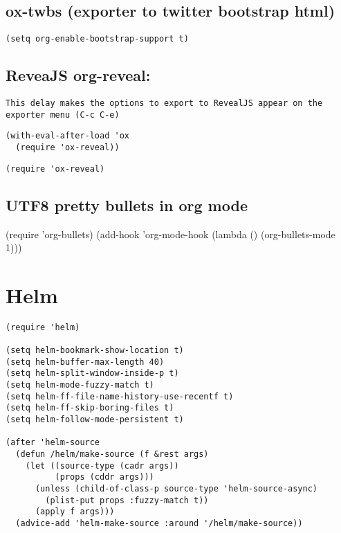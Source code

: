 \documentclass[11pt]{article}
\begin{document}
\subsection*{ox-twbs (exporter to twitter bootstrap html)}
\label{sec:orge287151}
\begin{verbatim}
(setq org-enable-bootstrap-support t)
\end{verbatim}

\subsection*{ReveaJS org-reveal:}
\label{sec:org500e21b}
\begin{verbatim}
This delay makes the options to export to RevealJS appear on the exporter menu (C-c C-e)
\end{verbatim}


\begin{verbatim}
(with-eval-after-load 'ox
  (require 'ox-reveal))
\end{verbatim}

\begin{verbatim}
(require 'ox-reveal)
\end{verbatim}


\subsection*{UTF8 pretty bullets in org mode}
\label{sec:org3bdd29f}
(require 'org-bullets)
(add-hook 'org-mode-hook (lambda () (org-bullets-mode 1)))


\section*{Helm}
\label{sec:orga8f7555}

\begin{verbatim}
(require 'helm)

(setq helm-bookmark-show-location t)
(setq helm-buffer-max-length 40)
(setq helm-split-window-inside-p t)
(setq helm-mode-fuzzy-match t)
(setq helm-ff-file-name-history-use-recentf t)
(setq helm-ff-skip-boring-files t)
(setq helm-follow-mode-persistent t)

(after 'helm-source
  (defun /helm/make-source (f &rest args)
    (let ((source-type (cadr args))
          (props (cddr args)))
      (unless (child-of-class-p source-type 'helm-source-async)
        (plist-put props :fuzzy-match t))
      (apply f args)))
  (advice-add 'helm-make-source :around '/helm/make-source))
\end{verbatim}
\end{document}

